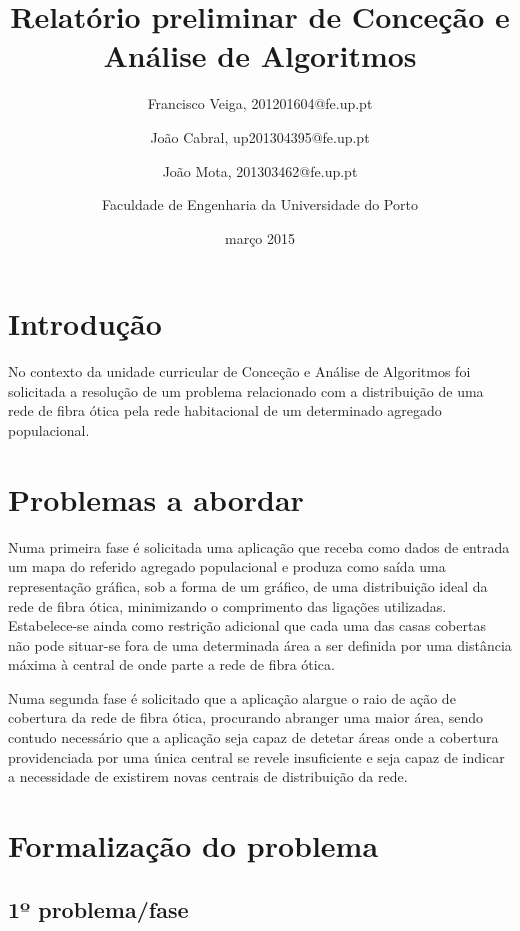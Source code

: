 \documentclass[a4paper,12pt,titlepage]{article}
\begin{document}
\title{Relatório preliminar de Conceção e Análise de Algoritmos}
\date{março 2015}
\author{Francisco Veiga, 201201604@fe.up.pt
 \and João Cabral, up201304395@fe.up.pt
 \and  João Mota, 201303462@fe.up.pt\linebreak

 \and Faculdade de Engenharia da Universidade do Porto}
%
\maketitle
\tableofcontents
\newpage
\section{Introdução}

No contexto da unidade curricular de Conceção e Análise de Algoritmos foi solicitada a resolução de um problema relacionado com a distribuição de uma rede de fibra ótica pela rede habitacional de um determinado agregado populacional.

\section{Problemas a abordar} 
Numa primeira fase é solicitada uma aplicação que receba como dados de entrada um mapa do referido agregado populacional e produza como saída uma representação gráfica, sob a forma de um gráfico, de uma distribuição ideal da rede de fibra ótica, minimizando o comprimento das ligações utilizadas. Estabelece-se ainda como restrição adicional que cada uma das casas cobertas não pode situar-se fora de uma determinada área a ser definida por uma distância máxima à central de onde parte a rede de fibra ótica.
 
Numa segunda fase é solicitado que a aplicação alargue o raio de ação de cobertura da rede de fibra ótica, procurando abranger uma maior área, sendo contudo necessário que a aplicação seja capaz de detetar áreas onde a cobertura providenciada por uma única central se revele insuficiente e seja capaz de indicar a necessidade de existirem novas centrais de distribuição da rede.

\newpage
\section{Formalização do problema}

\subsection{1º problema/fase}
\end{document}
